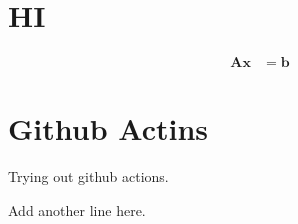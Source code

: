 \documentclass{article}
\begin{document}
\section{HI}
\begin{align}
 \mathbf{A}\mathbf{x} &= \mathbf{b}
\end{align}

\section{Github Actins}
Trying out github actions.

Add another line here.
\end{document}
